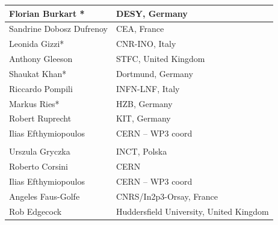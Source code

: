 {\begin{longtable}{|L{0.48\textwidth}|C{0.48\textwidth}|}
    Florian Burkart *	& DESY, Germany  \\ \hline
    Sandrine Dobosz Dufrenoy	& CEA, France  \\ \hline
    Leonida Gizzi*  	& CNR-INO, Italy  \\ \hline
    Anthony Gleeson 	& STFC, United Kingdom  \\ \hline
    Shaukat Khan*	& Dortmund, Germany  \\ \hline
    Riccardo Pompili 	& INFN-LNF, Italy  \\ \hline
    Markus Ries* 	& HZB, Germany  \\ \hline
    Robert Ruprecht 	& KIT, Germany  \\ \hline
    Ilias Efthymiopoulos	& CERN – WP3 coord  \\ \hline
     \\ \hline
    Urszula Gryczka	& INCT, Polska  \\ \hline
    Roberto Corsini	& CERN  \\ \hline
    Ilias Efthymiopoulos	& CERN – WP3 coord  \\ \hline
    Angeles Faus-Golfe	& CNRS/In2p3-Orsay, France  \\ \hline
    Rob Edgecock	& Huddersfield University, United Kingdom  \\ \hline
\end{longtable}}

